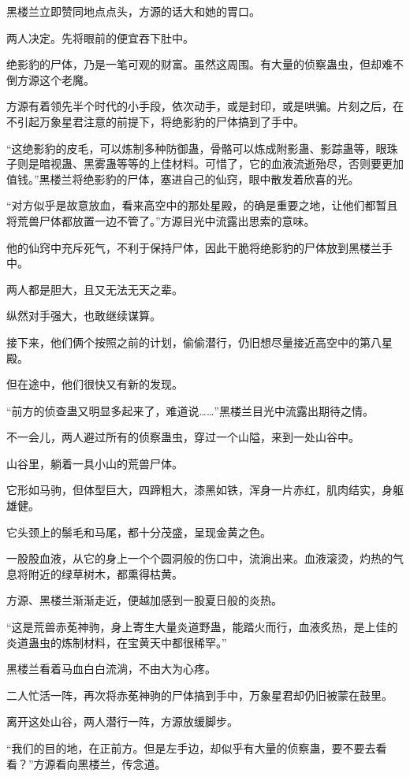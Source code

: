 \begin{this_body}
黑楼兰立即赞同地点点头，方源的话大和她的胃口。

两人决定。先将眼前的便宜吞下肚中。

绝影豹的尸体，乃是一笔可观的财富。虽然这周围。有大量的侦察蛊虫，但却难不倒方源这个老魔。

方源有着领先半个时代的小手段，依次动手，或是封印，或是哄骗。片刻之后，在不引起万象星君注意的前提下，将绝影豹的尸体搞到了手中。

“这绝影豹的皮毛，可以炼制多种防御蛊，骨骼可以炼成附影蛊、影踪蛊等，眼珠子则是暗视蛊、黑雾蛊等等的上佳材料。可惜了，它的血液流逝殆尽，否则要更加值钱。”黑楼兰将绝影豹的尸体，塞进自己的仙窍，眼中散发着欣喜的光。

“对方似乎是故意放血，看来高空中的那处星殿，的确是重要之地，让他们都暂且将荒兽尸体都放置一边不管了。”方源目光中流露出思索的意味。

他的仙窍中充斥死气，不利于保持尸体，因此干脆将绝影豹的尸体放到黑楼兰手中。

两人都是胆大，且又无法无天之辈。

纵然对手强大，也敢继续谋算。

接下来，他们俩个按照之前的计划，偷偷潜行，仍旧想尽量接近高空中的第八星殿。

但在途中，他们很快又有新的发现。

“前方的侦查蛊又明显多起来了，难道说……”黑楼兰目光中流露出期待之情。

不一会儿，两人避过所有的侦察蛊虫，穿过一个山隘，来到一处山谷中。

山谷里，躺着一具小山的荒兽尸体。

它形如马驹，但体型巨大，四蹄粗大，漆黑如铁，浑身一片赤红，肌肉结实，身躯雄健。

它头颈上的鬃毛和马尾，都十分茂盛，呈现金黄之色。

一股股血液，从它的身上一个个圆洞般的伤口中，流淌出来。血液滚烫，灼热的气息将附近的绿草树木，都熏得枯黄。

方源、黑楼兰渐渐走近，便越加感到一股夏日般的炎热。

“这是荒兽赤莬神驹，身上寄生大量炎道野蛊，能踏火而行，血液炙热，是上佳的炎道蛊虫的炼制材料，在宝黄天中都很稀罕。”

黑楼兰看着马血白白流淌，不由大为心疼。

二人忙活一阵，再次将赤莬神驹的尸体搞到手中，万象星君却仍旧被蒙在鼓里。

离开这处山谷，两人潜行一阵，方源放缓脚步。

“我们的目的地，在正前方。但是左手边，却似乎有大量的侦察蛊，要不要去看看？”方源看向黑楼兰，传念道。


\end{this_body}
